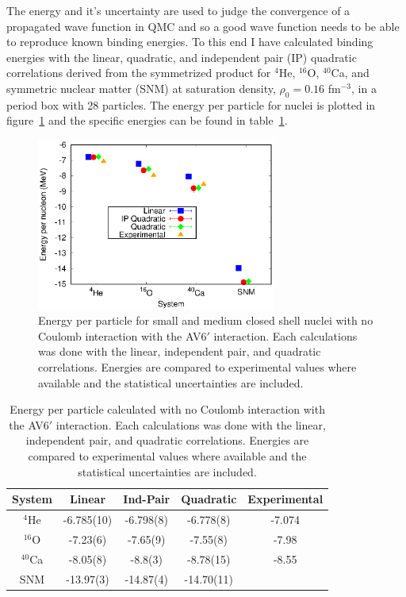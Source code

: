 The energy and it's uncertainty are used to judge the convergence of a propagated wave function in QMC and so a good wave function needs to be able to reproduce known binding energies. To this end I have calculated binding energies with the linear, quadratic, and independent pair (IP) quadratic correlations derived from the symmetrized product for $^4$He, $^{16}$O, $^{40}$Ca, and symmetric nuclear matter (SNM) at saturation density, $\rho_0=0.16$ fm$^{-3}$, in a period box with 28 particles. The energy per particle for nuclei is plotted in figure~\ref{fig:energies} and the specific energies can be found in table~\ref{tab:energies}.
\begin{figure}[h!]
   \centering
   \includegraphics[width=0.7\textwidth]{figures/energy.eps}
   \caption{Energy per particle for small and medium closed shell nuclei with no Coulomb interaction with the AV6$'$ interaction. Each calculations was done with the linear, independent pair, and quadratic correlations. Energies are compared to experimental values where available and the statistical uncertainties are included.}
   \label{fig:energies}
\end{figure}
\begin{table}[htb]
   \centering
   \begin{tabular}{ccccc}
      \hline\hline
      System & Linear & Ind-Pair & Quadratic & Experimental \\
      \hline
      $^4${He}    & -6.785(10)   & -6.798(8) & -6.778(8)    & -7.074 \\   
      $^{16}${O}  & -7.23(6)     & -7.65(9)  & -7.55(8)     & -7.98  \\   
      $^{40}${Ca} & -8.05(8)     & -8.8(3)   & -8.78(15)    & -8.55  \\
      SNM         & -13.97(3)    & -14.87(4) & -14.70(11)   &        \\
      \hline\hline
   \end{tabular}
   \label{tab:energies}
   \caption{Energy per particle calculated with no Coulomb interaction with the AV6$'$ interaction. Each calculations was done with the linear, independent pair, and quadratic correlations. Energies are compared to experimental values where available and the statistical uncertainties are included.}
\end{table}
